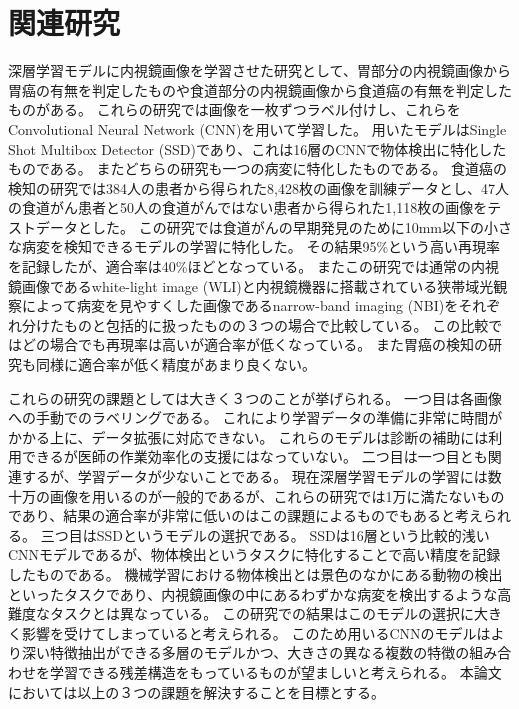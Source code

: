 \section{関連研究}

深層学習モデルに内視鏡画像を学習させた研究として、胃部分の内視鏡画像から胃癌の有無を判定したもの\cite{stomach_cancer}や食道部分の内視鏡画像から食道癌の有無を判定したもの\cite{stomach_cancer}がある。
これらの研究では画像を一枚ずつラベル付けし、これらをConvolutional Neural Network (CNN)\cite{CNN}を用いて学習した。
用いたモデルはSingle Shot Multibox Detector (SSD)\cite{SSD}であり、これは16層のCNNで物体検出に特化したものである。
またどちらの研究も一つの病変に特化したものである。
食道癌の検知の研究では384人の患者から得られた8,428枚の画像を訓練データとし、47人の食道がん患者と50人の食道がんではない患者から得られた1,118枚の画像をテストデータとした。
この研究では食道がんの早期発見のために10mm以下の小さな病変を検知できるモデルの学習に特化した。
その結果95\%という高い再現率を記録したが、適合率は40\%ほどとなっている。
またこの研究では通常の内視鏡画像であるwhite-light image (WLI)と内視鏡機器に搭載されている狭帯域光観察によって病変を見やすくした画像であるnarrow-band imaging (NBI)をそれぞれ分けたものと包括的に扱ったものの３つの場合で比較している。
この比較ではどの場合でも再現率は高いが適合率が低くなっている。
また胃癌の検知の研究も同様に適合率が低く精度があまり良くない。

これらの研究の課題としては大きく３つのことが挙げられる。
一つ目は各画像への手動でのラベリングである。
これにより学習データの準備に非常に時間がかかる上に、データ拡張に対応できない。
これらのモデルは診断の補助には利用できるが医師の作業効率化の支援にはなっていない。
二つ目は一つ目とも関連するが、学習データが少ないことである。
現在深層学習モデルの学習には数十万の画像を用いるのが一般的であるが、これらの研究では1万に満たないものであり、結果の適合率が非常に低いのはこの課題によるものでもあると考えられる。
三つ目はSSDというモデルの選択である。
SSDは16層という比較的浅いCNNモデルであるが、物体検出というタスクに特化することで高い精度を記録したものである。
機械学習における物体検出とは景色のなかにある動物の検出といったタスクであり、内視鏡画像の中にあるわずかな病変を検出するような高難度なタスクとは異なっている。
この研究での結果はこのモデルの選択に大きく影響を受けてしまっていると考えられる。
このため用いるCNNのモデルはより深い特徴抽出ができる多層のモデルかつ、大きさの異なる複数の特徴の組み合わせを学習できる残差構造をもっているものが望ましいと考えられる。
本論文においては以上の３つの課題を解決することを目標とする。


